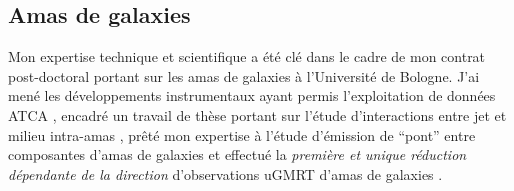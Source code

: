 %
%





\newpage
\subsection{Amas de galaxies}\label{pastwork.nenufar}

\pg
Mon expertise technique et scientifique a \'et\'e cl\'e dans le cadre de mon contrat post-doctoral portant sur les amas de galaxies \`a l'Universit\'e de Bologne. J'ai men\'e les d\'eveloppements instrumentaux ayant permis l'exploitation de donn\'ees ATCA \cite{2022MNRAS.515.1871R}, encadr\'e un travail de th\`ese portant sur l'\'etude d'interactions entre jet et milieu intra-amas \cite{2021A&A...650A.170B}, pr\^et\'e mon expertise \`a l'\'etude d'\'emission de ``pont'' entre composantes d'amas de galaxies \cite{2021ApJ...907...32B} et effectu\'e la \textit{premi\`ere et unique r\'eduction d\'ependante de la direction} d'observations uGMRT d'amas de galaxies \cite{2020A&A...636A..30R}. %


